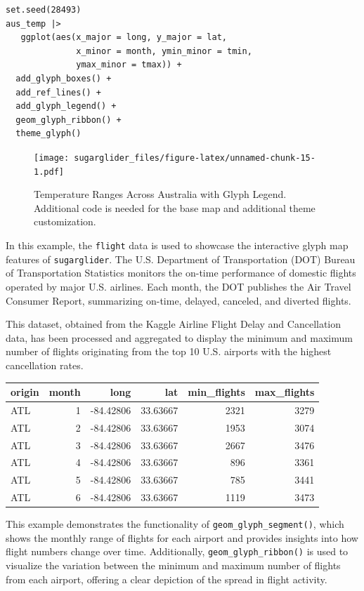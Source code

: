 \begin{verbatim}
set.seed(28493)
aus_temp |>
   ggplot(aes(x_major = long, y_major = lat,
              x_minor = month, ymin_minor = tmin,
              ymax_minor = tmax)) +
  add_glyph_boxes() +
  add_ref_lines() +
  add_glyph_legend() +
  geom_glyph_ribbon() +
  theme_glyph() 
\end{verbatim}

\begin{figure}
\centering
\texttt{[image: sugarglider\_files/figure-latex/unnamed-chunk-15-1.pdf]}
\caption{\label{fig:unnamed-chunk-15}Temperature Ranges Across Australia with Glyph Legend. Additional code is needed for the base map and additional theme customization.}
\end{figure}

In this example, the \texttt{flight} data is used to showcase the interactive glyph map features of \texttt{sugarglider}. The U.S. Department of Transportation (DOT) Bureau of Transportation Statistics monitors the on-time performance of domestic flights operated by major U.S. airlines. Each month, the DOT publishes the Air Travel Consumer Report, summarizing on-time, delayed, canceled, and diverted flights.

This dataset, obtained from the Kaggle Airline Flight Delay and Cancellation data, has been processed and aggregated to display the minimum and maximum number of flights originating from the top 10 U.S. airports with the highest cancellation rates.

\begin{table}
\centering
\begin{tabular}{l|r|r|r|r|r}
\hline
origin & month & long & lat & min\_flights & max\_flights\\
\hline
ATL & 1 & -84.42806 & 33.63667 & 2321 & 3279\\
\hline
ATL & 2 & -84.42806 & 33.63667 & 1953 & 3074\\
\hline
ATL & 3 & -84.42806 & 33.63667 & 2667 & 3476\\
\hline
ATL & 4 & -84.42806 & 33.63667 & 896 & 3361\\
\hline
ATL & 5 & -84.42806 & 33.63667 & 785 & 3441\\
\hline
ATL & 6 & -84.42806 & 33.63667 & 1119 & 3473\\
\hline
\end{tabular}
\end{table}

This example demonstrates the functionality of \texttt{geom\_glyph\_segment()}, which shows the monthly range of flights for each airport and provides insights into how flight numbers change over time. Additionally, \texttt{geom\_glyph\_ribbon()} is used to visualize the variation between the minimum and maximum number of flights from each airport, offering a clear depiction of the spread in flight activity.

